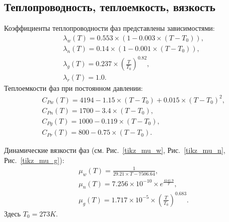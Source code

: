 \subsection{Теплопроводность, теплоемкость, вязкость}
Коэффициенты теплопроводности фаз представлены зависимостями:
\begin{equation}
  \begin{aligned}
    &\lambda_w(T)=0.553\times(1-0.003\times(T-T_0)),\\
    &\lambda_n(T)=0.14\times(1-0.001\times(T-T_0)),\\
    &\lambda_g(T)=0.237\times\left(\frac{T}{T_0}\right)^{0.82},\\
    &\lambda_r(T)=1.0.
  \end{aligned}
\end{equation}
Теплоемкости фаз при постоянном давлении:
\begin{equation}
  \begin{aligned}
    &C_{Pw}(T)= 4194 - 1.15 \times (T-T_0) + 0.015 \times (T-T_0)^2,\\
    &C_{Pn}(T)= 1700 - 3.4 \times (T-T_0),\\
    &C_{Pg}(T)= 1000 - 0.119 \times (T-T_0),\\
    &C_{Pr}(T)= 800 - 0.75 \times (T-T_0).
  \end{aligned}
\end{equation}

Динамические вязкости фаз (см. Рис.~\ref{tikz_mu_w}, Рис.~\ref{tikz_mu_n}, Рис.~\ref{tikz_mu_g}):
\begin{equation}
  \begin{aligned}
    &\mu_w(T)=\frac{1}{29.21 \times T - 7506.64},\\
    &\mu_n(T)=7.256\times10^{-10} \times e^{\frac{4141.9}{T}},\\
    &\mu_g(T)=1.717\times10^{-5} \times \left(\frac{T}{T_0}\right)^{0.683}.
  \end{aligned}
\end{equation}
Здесь $T_0=273K$.

